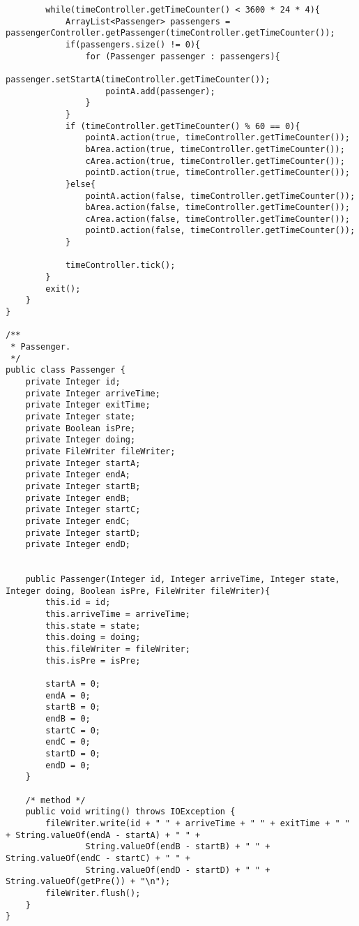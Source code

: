 \begin{lstlisting}
        while(timeController.getTimeCounter() < 3600 * 24 * 4){
            ArrayList<Passenger> passengers = passengerController.getPassenger(timeController.getTimeCounter());
            if(passengers.size() != 0){
                for (Passenger passenger : passengers){
                    passenger.setStartA(timeController.getTimeCounter());
                    pointA.add(passenger);
                }
            }
            if (timeController.getTimeCounter() % 60 == 0){
                pointA.action(true, timeController.getTimeCounter());
                bArea.action(true, timeController.getTimeCounter());
                cArea.action(true, timeController.getTimeCounter());
                pointD.action(true, timeController.getTimeCounter());
            }else{
                pointA.action(false, timeController.getTimeCounter());
                bArea.action(false, timeController.getTimeCounter());
                cArea.action(false, timeController.getTimeCounter());
                pointD.action(false, timeController.getTimeCounter());
            }

            timeController.tick();
        }
        exit();
    }
}

/**
 * Passenger.
 */
public class Passenger {
    private Integer id;
    private Integer arriveTime;
    private Integer exitTime;
    private Integer state;
    private Boolean isPre;
    private Integer doing;
    private FileWriter fileWriter;
    private Integer startA;
    private Integer endA;
    private Integer startB;
    private Integer endB;
    private Integer startC;
    private Integer endC;
    private Integer startD;
    private Integer endD;


    public Passenger(Integer id, Integer arriveTime, Integer state, Integer doing, Boolean isPre, FileWriter fileWriter){
        this.id = id;
        this.arriveTime = arriveTime;
        this.state = state;
        this.doing = doing;
        this.fileWriter = fileWriter;
        this.isPre = isPre;

        startA = 0;
        endA = 0;
        startB = 0;
        endB = 0;
        startC = 0;
        endC = 0;
        startD = 0;
        endD = 0;
    }

    /* method */
    public void writing() throws IOException {
        fileWriter.write(id + " " + arriveTime + " " + exitTime + " " + String.valueOf(endA - startA) + " " +
                String.valueOf(endB - startB) + " " + String.valueOf(endC - startC) + " " +
                String.valueOf(endD - startD) + " " + String.valueOf(getPre()) + "\n");
        fileWriter.flush();
    }
}


\end{lstlisting}
